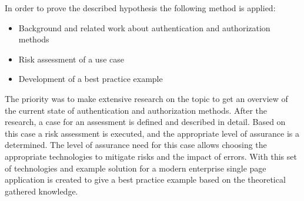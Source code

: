 In order to prove the described hypothesis the following method is applied:

\begin{itemize}
	\item Background and related work about authentication and authorization methods
	\item Risk assessment of a use case
	\item Development of a best practice example
\end{itemize}

The priority was to make extensive research on the topic to get an overview of the current state of authentication and authorization methods. After the research, a case for an assessment is defined and described in detail. Based on this case a risk assessment is executed, and the appropriate level of assurance is a determined. The level of assurance need for this case allows choosing the appropriate technologies to mitigate risks and the impact of errors. With this set of technologies and example solution for a modern enterprise single page application is created to give a best practice example based on the theoretical gathered knowledge.


\chapterend
